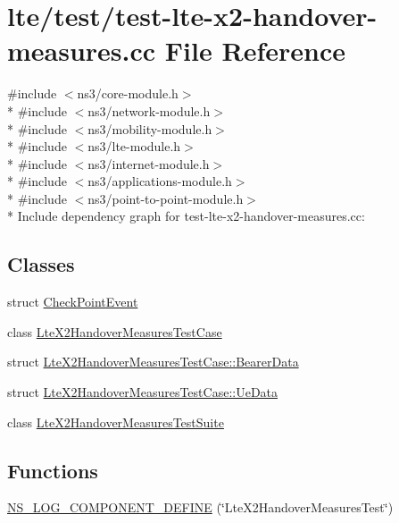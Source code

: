 \hypertarget{test-lte-x2-handover-measures_8cc}{}\section{lte/test/test-\/lte-\/x2-\/handover-\/measures.cc File Reference}
\label{test-lte-x2-handover-measures_8cc}
{\ttfamily \#include $<$ns3/core-\/module.\+h$>$}\\*
{\ttfamily \#include $<$ns3/network-\/module.\+h$>$}\\*
{\ttfamily \#include $<$ns3/mobility-\/module.\+h$>$}\\*
{\ttfamily \#include $<$ns3/lte-\/module.\+h$>$}\\*
{\ttfamily \#include $<$ns3/internet-\/module.\+h$>$}\\*
{\ttfamily \#include $<$ns3/applications-\/module.\+h$>$}\\*
{\ttfamily \#include $<$ns3/point-\/to-\/point-\/module.\+h$>$}\\*
Include dependency graph for test-\/lte-\/x2-\/handover-\/measures.cc\+:
\subsection*{Classes}
\begin{DoxyCompactItemize}
\item 
struct \hyperlink{structCheckPointEvent}{Check\+Point\+Event}
\item 
class \hyperlink{classLteX2HandoverMeasuresTestCase}{Lte\+X2\+Handover\+Measures\+Test\+Case}
\item 
struct \hyperlink{structLteX2HandoverMeasuresTestCase_1_1BearerData}{Lte\+X2\+Handover\+Measures\+Test\+Case\+::\+Bearer\+Data}
\item 
struct \hyperlink{structLteX2HandoverMeasuresTestCase_1_1UeData}{Lte\+X2\+Handover\+Measures\+Test\+Case\+::\+Ue\+Data}
\item 
class \hyperlink{classLteX2HandoverMeasuresTestSuite}{Lte\+X2\+Handover\+Measures\+Test\+Suite}
\end{DoxyCompactItemize}
\subsection*{Functions}
\begin{DoxyCompactItemize}
\item 
\hyperlink{test-lte-x2-handover-measures_8cc_a482e57fdb4edfbc143626d6e48346dea}{N\+S\+\_\+\+L\+O\+G\+\_\+\+C\+O\+M\+P\+O\+N\+E\+N\+T\+\_\+\+D\+E\+F\+I\+NE} (\char`\"{}Lte\+X2\+Handover\+Measures\+Test\char`\"{})
\end{DoxyCompactItemize}
